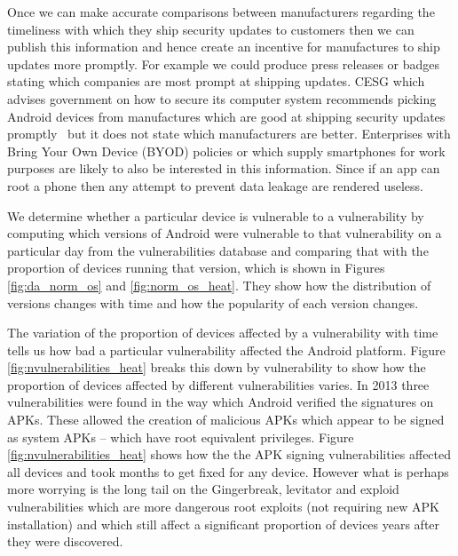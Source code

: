 \documentclass[a4paper,twocolumn]{article}
\begin{document}
Once we can make accurate comparisons between manufacturers regarding the timeliness with which they ship security updates to customers then we can publish this information and hence create an incentive for manufactures to ship updates more promptly.
For example we could produce press releases or badges stating which companies are most prompt at shipping updates.
CESG which advises government on how to secure its computer system recommends picking Android devices from manufactures which are good at shipping security updates promptly~\cite{CESG2013} but it does not state which manufacturers are better.
Enterprises with Bring Your Own Device (BYOD) policies or which supply smartphones for work purposes are likely to also be interested in this information.
Since if an app can root a phone then any attempt to prevent data leakage are rendered useless.

We determine whether a particular device is vulnerable to a vulnerability by computing which versions of Android were vulnerable to that vulnerability on a particular day from the vulnerabilities database and comparing that with the proportion of devices running that version, which is shown in Figures \ref{fig:da_norm_os} and \ref{fig:norm_os_heat}.
They show how the distribution of versions changes with time and how the popularity of each version changes.

The variation of the proportion of devices affected by a vulnerability with time tells us how bad a particular vulnerability affected the Android platform.
Figure \ref{fig:nvulnerabilities_heat} breaks this down by vulnerability to show how the proportion of devices affected by different vulnerabilities varies.
In 2013 three vulnerabilities were found in the way which Android verified the signatures on APKs.
These allowed the creation of malicious APKs which appear to be signed as system APKs -- which have root equivalent privileges.
Figure \ref{fig:nvulnerabilities_heat} shows how the the APK signing vulnerabilities affected all devices and took months to get fixed for any device.
However what is perhaps more worrying is the long tail on the Gingerbreak, levitator and exploid vulnerabilities which are more dangerous root exploits (not requiring new APK installation) and which still affect a significant proportion of devices years after they were discovered.
\end{document}
